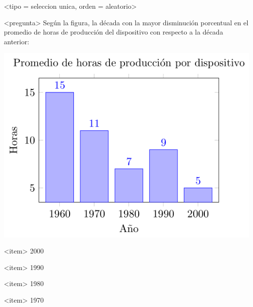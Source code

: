 <tipo = seleccion unica, orden = aleatorio>

<pregunta>
Según la figura, la década con la mayor disminución porcentual en el promedio de horas de producción del dispositivo con respecto a la década anterior:
\begin{center}
  \includegraphics[scale=0.5]{../promedio.png}
\end{center}

<item>
2000

<item>
1990

<item>
1980

<item>
1970

